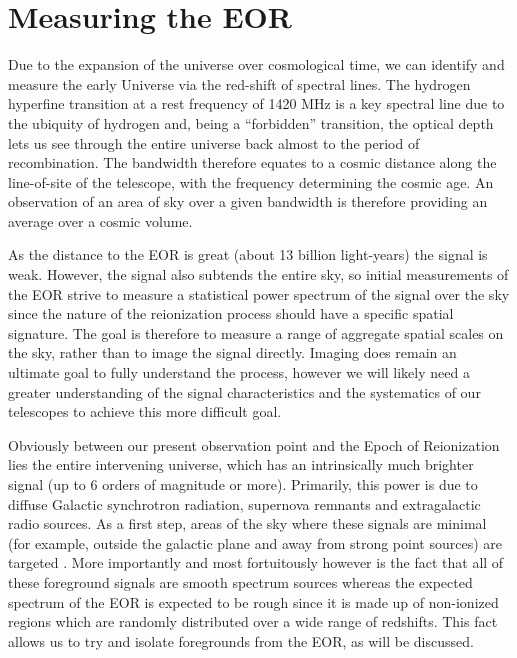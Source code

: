 \documentclass[preprint,11pt]{aastex}
\begin{document}
\section{Measuring the EOR}
\label{sec:eormeas}
Due to the expansion of the universe over cosmological time, we can identify and measure the early Universe via the red-shift of spectral lines.  The hydrogen hyperfine transition at a rest frequency of 1420 MHz is a key spectral line due to the ubiquity of hydrogen and, being a ``forbidden'' transition, the optical depth lets us see through the entire universe back almost to the period of recombination.  The bandwidth
therefore equates to a cosmic distance along the line-of-site of the telescope, with the frequency determining the cosmic age.  An observation of an area of sky over a given bandwidth is therefore providing an average
over a cosmic volume.

As the distance to the EOR is great (about 13 billion light-years) the signal is weak.  However, the signal also subtends the entire sky, so initial measurements of the EOR strive to measure a statistical power spectrum of the signal over the sky since the nature of the reionization process should have a specific spatial signature.  The goal is therefore to measure a range of aggregate spatial scales on the sky, rather than to image the signal directly.  Imaging does remain an ultimate goal to fully understand the process, however we will likely need a greater understanding of the signal characteristics and the systematics of our telescopes to achieve this more difficult goal.  

Obviously between our present observation point and the Epoch of Reionization lies the entire intervening universe, which has an intrinsically much brighter signal (up to 6 orders of magnitude or more).  Primarily, this power is due to diffuse Galactic synchrotron radiation, supernova remnants and extragalactic radio sources.  As a first step, areas of the sky where these signals are minimal (for example, outside the galactic plane and away from strong point sources) are targeted \citep{bernardi_2013}.  More importantly and most fortuitously however is the fact that all of these foreground signals are smooth spectrum sources whereas the expected spectrum of the EOR is expected to be rough since it is made up of non-ionized regions which are randomly distributed over a wide range of redshifts.  This fact allows us to try and isolate foregrounds from the EOR, as will be discussed.
\end{document}
